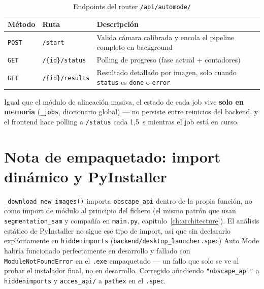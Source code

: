 \begin{table}[H]
\centering
\caption{Endpoints del router \texttt{/api/automode/}}
\label{tab:api-automode}
\begin{tabular}{C{1.5cm} L{5cm} L{6cm}}
\toprule
\textbf{Método} & \textbf{Ruta} & \textbf{Descripción} \\
\midrule
\texttt{POST} & \texttt{/start}            & Valida cámara calibrada y encola el pipeline completo en background \\
\texttt{GET}  & \texttt{/\{id\}/status}    & Polling de progreso (fase actual + contadores) \\
\texttt{GET}  & \texttt{/\{id\}/results}   & Resultado detallado por imagen, solo cuando \texttt{status} es \texttt{done} o \texttt{error} \\
\bottomrule
\end{tabular}
\end{table}

Igual que el módulo de alineación masiva, el estado de cada job vive \textbf{solo en memoria}
(\texttt{\_jobs}, diccionario global) — no persiste entre reinicios del backend, y el frontend
hace polling a \texttt{/status} cada 1,5~s mientras el job está en curso.

\section{Nota de empaquetado: import dinámico y PyInstaller}

\texttt{\_download\_new\_images()} importa \texttt{obscape\_api} dentro de la propia función,
no como import de módulo al principio del fichero (el mismo patrón que usan
\texttt{segmentation\_sam} y compañía en \texttt{main.py}, capítulo~\ref{ch:architecture}). El
análisis estático de PyInstaller no sigue ese tipo de import, así que sin declararlo
explícitamente en \texttt{hiddenimports} (\texttt{backend/desktop\_launcher.spec}) Auto Mode
habría funcionado perfectamente en desarrollo y fallado con \texttt{ModuleNotFoundError} en el
\texttt{.exe} empaquetado — un fallo que solo se ve al probar el instalador final, no en
desarrollo. Corregido añadiendo \texttt{"obscape\_api"} a \texttt{hiddenimports} y
\texttt{acces\_api/} a \texttt{pathex} en el \texttt{.spec}.

